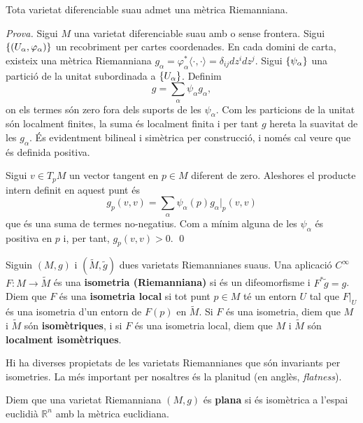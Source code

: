 \begin{prop}
    Tota varietat diferenciable suau admet una mètrica Riemanniana.
\end{prop}
{
    \color{green!50!black} \textit{Prova.}
    Sigui $M$ una varietat diferenciable suau {\color{blue}amb o sense frontera}. Sigui $\{(U_\alpha,\varphi_\alpha)\}$ un recobriment per cartes coordenades. En cada domini de carta, existeix una mètrica Riemanniana $g_\alpha = \varphi_\alpha^*\langle\cdot,\cdot\rangle = \delta_{ij}dz^idz^j$. Sigui $\{\psi_\alpha\}$ una partició de la unitat subordinada a $\{U_\alpha\}$. Definim 
    \begin{equation*}
        g = \sum_{\alpha} \psi_\alpha g_\alpha,
    \end{equation*}
    on els termes són zero fora dels suports de les $\psi_\alpha$. Com les particions de la unitat són localment finites, la suma és localment finita i per tant $g$ hereta la suavitat de les $g_\alpha$. És evidentment bilineal i simètrica per construcció, i només cal veure que és definida positiva.

    Sigui $v\in T_pM$ un vector tangent en $p\in M$ diferent de zero. Aleshores el producte intern definit en aquest punt és
    \begin{equation*}
        g_p(v,v) = \sum_\alpha \psi_\alpha(p) g_\alpha|_p(v,v)
    \end{equation*}
    que és una suma de termes no-negatius. Com a mínim alguna de les $\psi_\alpha$ és positiva en $p$ i, per tant, $g_p(v,v) > 0$.
    \qed
}

\begin{defi}
    Siguin $(M,g)$ i $(\tilde M,\tilde g)$ dues varietats Riemannianes {\color{blue} suaus}. Una aplicació {\color{blue} $C^\infty$} $F: M\to \tilde M$ és una \textbf{isometria (Riemanniana)} si és un difeomorfisme i $F^*\tilde g = g$. Diem que $F$ és una \textbf{isometria local} si tot punt $p\in M$ té un entorn $U$ tal que $F|_U$ és una isometria d'un entorn de $F(p)$ en $\tilde M$. Si $F$ és una isometria, diem que $M$ i $\tilde M$ són \textbf{isomètriques}, i si $F$ és una isometria local, diem que $M$ i $\tilde M$ són \textbf{localment isomètriques}.
\end{defi}

Hi ha diverses propietats de les varietats Riemannianes que són invariants per isometries. La més important per nosaltres és la planitud (en anglès, \textit{flatness}).
\begin{defi}\label{def:flatness}
    Diem que una varietat Riemanniana $(M,g)$ és \textbf{plana} si és isomètrica a l'espai euclidià $\mathbb R^n$ amb la mètrica euclidiana.
\end{defi}

